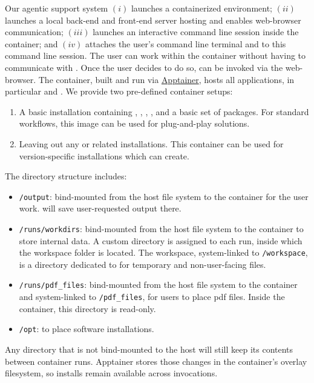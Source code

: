 \documentclass[submission, Phys]{SciPost}
\begin{document}
Our agentic support system $(i)$ launches a containerized environment; $(ii)$ launches a local back-end and front-end server hosting \ma and enables web-browser communication; $(iii)$ launches an interactive command line session inside the container; and $(iv)$ attaches the user's command line terminal and \ma to this command line session. The user can work within the container without having to communicate with \ma. Once the user decides to do so, \ma can be invoked via the web-browser. The container, built and run via \href{https://apptainer.org/}{Apptainer}, hosts all applications, in particular \ma and \mg. We provide two pre-defined container setups:
%
\begin{enumerate}
\item A basic \mg installation containing \fastjet, \lhapdf, , \delphes, and a basic set of \python packages. For standard \mg workflows, this image can be used for plug-and-play solutions.
\item Leaving out any \mg or \python related installations. This container can be used for version-specific installations which \ma can create.
\end{enumerate}
%
The directory structure includes:
%
\begin{itemize}
\item \lstinline|/output|: bind-mounted from the host file system to the container for the user work. \ma will save user-requested output there.
\item \lstinline|/runs/workdirs|: bind-mounted from the host file system to the container to store \ma internal data. A custom directory is assigned to each run, inside which the \ma workspace folder is located. The workspace, system-linked to \lstinline|/workspace|, is a directory dedicated to \ma for temporary and non-user-facing files.
\item \lstinline|/runs/pdf_files|: bind-mounted from the host file system to the container and system-linked to \lstinline|/pdf_files|, for users to place pdf files. Inside the container, this directory is read-only.
\item \lstinline|/opt|: to place software installations.
\end{itemize}
%
Any directory that is not bind-mounted to the host will still keep its contents between container runs. Apptainer stores those changes in the container’s overlay filesystem, so installs remain available across \ma invocations. 

\clearpage
\end{document}
